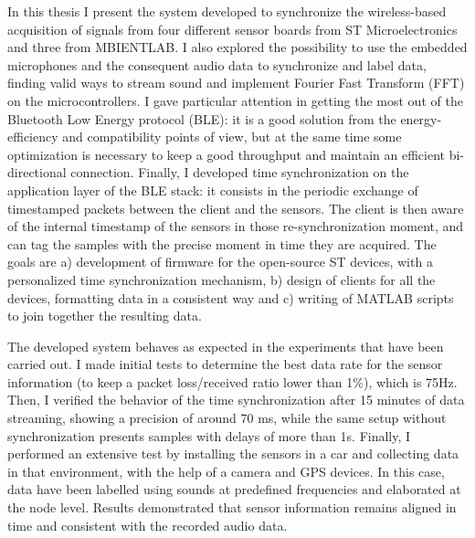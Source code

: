 In this thesis I present the system developed to synchronize the wireless-based acquisition of signals from four different sensor boards from ST Microelectronics and three from MBIENTLAB.
I also explored the possibility to use the embedded microphones and the consequent audio data to synchronize and label data, finding valid ways to stream sound and implement Fourier Fast Transform (FFT) on the microcontrollers. 
I gave particular attention in getting the most out of the Bluetooth Low Energy protocol (BLE): it is a good solution from the energy-efficiency and compatibility points of view, but at the same time some optimization is necessary to keep a good throughput and maintain an efficient bi-directional connection. 
Finally, I developed time synchronization on the application layer of the BLE stack: it consists in the periodic exchange of timestamped packets between the client and the sensors. 
The client is then aware of the internal timestamp of the sensors in those re-synchronization moment, and can tag the samples with the precise moment in time they are acquired. 
The goals are 
a) development of firmware for the open-source ST devices, with a personalized time synchronization mechanism, 
b) design of clients for all the devices, formatting data in a consistent way and 
c) writing of MATLAB scripts to join together the resulting data. 

The developed system behaves as expected in the experiments that have been carried out. 
I made initial tests to determine the best data rate for the sensor information (to keep a packet loss/received ratio lower than 1\%), which is 75Hz. 
Then, I verified the behavior of the time synchronization after 15 minutes of data streaming, showing a precision of around 70 ms, while the same setup without synchronization presents samples with delays of more than 1s. 
Finally, I performed an extensive test by installing the sensors in a car and collecting data in that environment, with the help of a camera and GPS devices. 
In this case, data have been labelled using sounds at predefined frequencies and elaborated at the node level. 
Results demonstrated that sensor information remains aligned in time and consistent with the recorded audio data.
